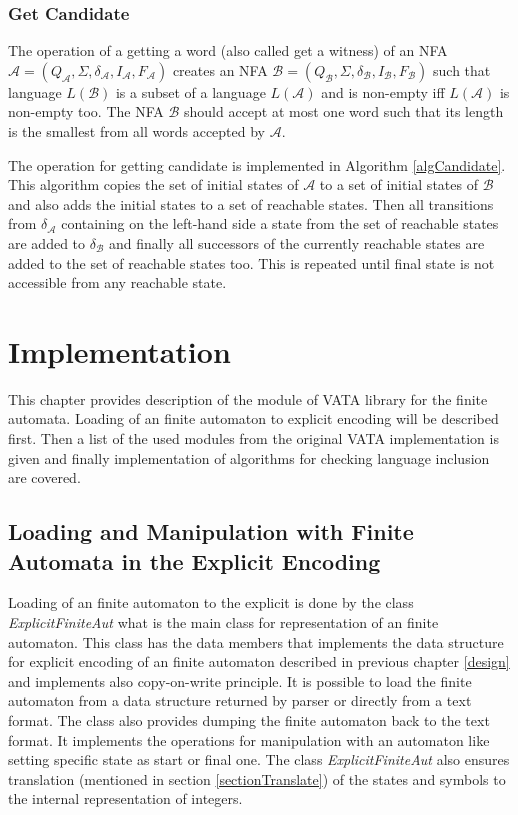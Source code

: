 \subsection{Get Candidate}
The operation of a getting a word (also called get a witness) of an NFA $\mathcal{A}=(Q_\mathcal{A},\Sigma,\delta_\mathcal{A},I_\mathcal{A},F_\mathcal{A})$ 
creates an NFA $\mathcal{B}=(Q_\mathcal{B},\Sigma,\delta_\mathcal{B},I_\mathcal{B},F_\mathcal{B})$ such that language $L(\mathcal{B})$
is a subset of a language $L(\mathcal{A})$ and is non-empty iff $L(\mathcal{A})$ is non-empty too.
The NFA $\mathcal{B}$ should accept at most one word such that its length is the smallest from all words accepted by $\mathcal{A}$.

The operation for getting candidate is implemented in Algorithm \ref{algCandidate}. This algorithm copies the set of initial states 
of $\mathcal{A}$ to a set of initial states of $\mathcal{B}$ and also adds the initial states to a set of reachable states. 
Then all transitions from $\delta_\mathcal{A}$ containing on the left-hand side a state from the set of reachable states are added to $\delta_\mathcal{B}$ 
and finally
all successors of the currently reachable states are added to the set of reachable states too. 
This is repeated until final state is not accessible from any reachable state. 

\chapter{Implementation}
\label{implementation}
This chapter provides description of the module of VATA library for the finite automata. Loading of an finite
automaton to explicit encoding will be described first. 
Then a list of the used modules from the original VATA implementation is given and finally implementation of algorithms 
for checking language inclusion are covered.

\section{Loading and Manipulation with Finite Automata in the Explicit Encoding}
Loading of an finite automaton to the explicit is done by  the class \emph{ExplicitFiniteAut} what is the main class for representation of an finite automaton. 
This class has the data members that implements the data structure for explicit encoding of an finite automaton described in previous chapter \ref{design} and
implements also copy-on-write principle. 
It is possible to load the finite automaton from a data structure returned by parser or directly from a text format. The class also provides dumping
the finite automaton back to the text format.
It implements the operations for manipulation with an automaton like setting specific state as start or final one.
The class \emph{ExplicitFiniteAut} also ensures translation (mentioned in section \ref{sectionTranslate}) of the states 
and symbols to the internal representation of integers. 

